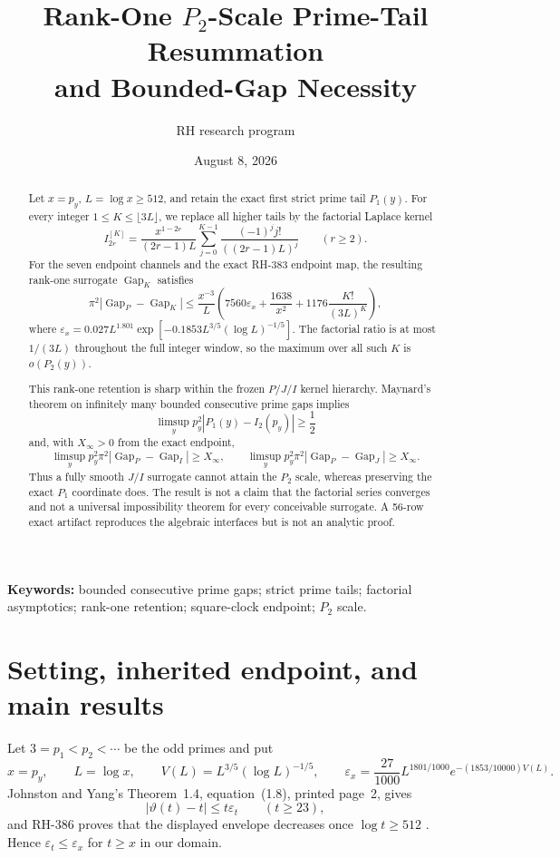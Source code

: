 \documentclass[11pt]{article}
\title{Rank-One $P_2$-Scale Prime-Tail Resummation\\
and Bounded-Gap Necessity}
\author{RH research program}
\date{August 8, 2026}
\theoremstyle{definition}
\theoremstyle{remark}
\newcommand{\eps}{\varepsilon}
\newcommand{\GapP}{\operatorname{Gap}_{P}}
\newcommand{\GapJ}{\operatorname{Gap}_{J}}
\newcommand{\GapI}{\operatorname{Gap}_{I}}
\newcommand{\GapK}{\operatorname{Gap}_{K}}
\begin{document}
\maketitle

\begin{abstract}
Let $x=p_y$, $L=\log x\ge512$, and retain the exact first strict prime
tail $P_1(y)$.  For every integer $1\le K\le\lfloor3L\rfloor$, we
replace all higher tails by the factorial Laplace kernel
\[
 I_{2r}^{[K]}=\frac{x^{1-2r}}{(2r-1)L}
 \sum_{j=0}^{K-1}\frac{(-1)^j j!}{((2r-1)L)^j}\qquad(r\ge2).
\]
For the seven endpoint channels and the exact RH-383 endpoint map, the
resulting rank-one surrogate $\GapK$ satisfies
\[
 \pi^2|\GapP-\GapK|
 \le \frac{x^{-3}}{L}\left(
 7560\eps_x+\frac{1638}{x^2}
 +1176\frac{K!}{(3L)^K}\right),
\]
where $\eps_x=0.027L^{1.801}\exp[-0.1853L^{3/5}(\log L)^{-1/5}]$.
The factorial ratio is at most $1/(3L)$ throughout the full integer
window, so the maximum over all such $K$ is $o(P_2(y))$.

This rank-one retention is sharp within the frozen $P/J/I$ kernel
hierarchy.  Maynard's theorem on infinitely many bounded consecutive
prime gaps implies
\[
 \limsup_y p_y^2|P_1(y)-I_2(p_y)|\ge\frac12
\]
and, with $X_\infty>0$ from the exact endpoint,
\[
 \limsup_y p_y^2\pi^2|\GapP-\GapI|\ge X_\infty,
 \qquad
 \limsup_y p_y^2\pi^2|\GapP-\GapJ|\ge X_\infty.
\]
Thus a fully smooth $J/I$ surrogate cannot attain the $P_2$ scale,
whereas preserving the exact $P_1$ coordinate does.  The result is not a
claim that the factorial series converges and not a universal
impossibility theorem for every conceivable surrogate.  A 56-row exact
artifact reproduces the algebraic interfaces but is not an analytic
proof.
\end{abstract}

\noindent\textbf{Keywords:} bounded consecutive prime gaps; strict prime
tails; factorial asymptotics; rank-one retention; square-clock endpoint;
$P_2$ scale.

\section{Setting, inherited endpoint, and main results}

Let $3=p_1<p_2<\cdots$ be the odd primes and put
\[
 x=p_y,\qquad L=\log x,\qquad
 V(L)=L^{3/5}(\log L)^{-1/5},\qquad
 \eps_x=\frac{27}{1000}L^{1801/1000}
 e^{-(1853/10000)V(L)}.
\]
Johnston and Yang's Theorem~1.4, equation~(1.8), printed page~2, gives
\begin{equation}
 |\vartheta(t)-t|\le t\eps_t\qquad(t\ge23),
 \label{eq:JY}
\end{equation}
and RH-386 proves that the displayed envelope decreases once
$\log t\ge512$ \cite{JohnstonYang2023,RH386}.  Hence $\eps_t\le\eps_x$
for $t\ge x$ in our domain.
\end{document}
